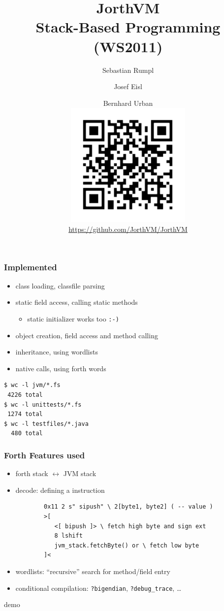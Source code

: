 \documentclass{beamer}
\title{JorthVM\\\small{Stack-Based Programming (WS2011)}}
\author{Sebastian Rumpl \and Josef Eisl \and Bernhard
Urban\\\includegraphics{../github}\\\url{https://github.com/JorthVM/JorthVM}}
\begin{document}
\frame{\titlepage}
\begin{frame}[fragile]
	\frametitle{Implemented}
	\begin{itemize}
		\item class loading, classfile parsing
		\pause
		\item static field access, calling static methods
		\pause
		\begin{itemize}
			\pause
			\item static initializer works too \texttt{:-)}
		\end{itemize}
		\pause
		\item object creation, field access and method calling
		\pause
		\item inheritance, using wordlists
		\pause
		\item native calls, using forth words
	\end{itemize}
	\pause
	\small
\begin{verbatim}
$ wc -l jvm/*.fs
 4226 total
$ wc -l unittests/*.fs
 1274 total
$ wc -l testfiles/*.java
  480 total
\end{verbatim}
\end{frame}

\lstset{
	basicstyle=\scriptsize
}
\begin{frame}[fragile]
	\frametitle{Forth Features used}
	
	\begin{itemize}
		\item forth stack $\leftrightarrow$ JVM stack
		\pause
		\item decode: defining a instruction
		\pause
		\begin{verbatim}
		0x11 2 s" sipush" \ 2[byte1, byte2] ( -- value )
		>[
		   <[ bipush ]> \ fetch high byte and sign ext
		   8 lshift
		   jvm_stack.fetchByte() or \ fetch low byte
		]<
		\end{verbatim}
		\pause
		\item wordlists: ``recursive'' search for method/field entry
		\pause
		\item conditional compilation: \texttt{?bigendian},
		\texttt{?debug\_trace}, \dots
	\end{itemize}
\end{frame}

\begin{frame}
	\begin{center}
		demo
	\end{center}
\end{frame}
\end{document}

